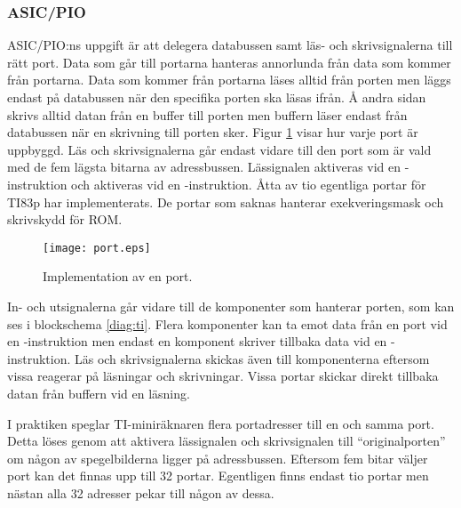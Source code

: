 \documentclass[main.tex]{subfiles}
\begin{document}
\subsubsection{ASIC/PIO}
ASIC/PIO:ns uppgift är att delegera databussen samt läs- och skrivsignalerna
till rätt port. Data som går till portarna hanteras annorlunda från data som
kommer från portarna. Data som kommer från portarna läses alltid från porten
men läggs endast på databussen när den specifika porten ska läsas ifrån. Å
andra sidan skrivs alltid datan från en buffer till porten men buffern läser
endast från databussen när en skrivning till porten sker. Figur \ref{fig:port}
visar hur varje port är uppbyggd. Läs och skrivsignalerna går endast vidare
till den port som är vald med de fem lägsta bitarna av adressbussen.
Lässignalen  aktiveras vid en -instruktion och 
aktiveras vid en -instruktion. Åtta av tio egentliga portar för TI83p
har implementerats. De portar som saknas hanterar exekveringsmask och
skrivskydd för ROM.

\begin{figure}[H]
    \center
    \texttt{[image: port.eps]}
    \caption{Implementation av en port.}
    \label{fig:port}
\end{figure}

In- och utsignalerna går vidare till de komponenter som hanterar porten, som
kan ses i blockschema \ref{diag:ti}. Flera komponenter kan ta emot data från en
port vid en -instruktion men endast en komponent skriver tillbaka
data vid en -instruktion. Läs och skrivsignalerna skickas även till
komponenterna eftersom vissa reagerar på läsningar och skrivningar. Vissa
portar skickar direkt tillbaka datan från buffern vid en läsning.

I praktiken speglar TI-miniräknaren flera portadresser till en och samma port.
Detta löses genom att aktivera lässignalen och skrivsignalen till
``originalporten'' om någon av spegelbilderna ligger på adressbussen. Eftersom
fem bitar väljer port kan det finnas upp till 32 portar. Egentligen finns
endast tio portar men nästan alla 32 adresser pekar till någon av dessa.
\end{document}
